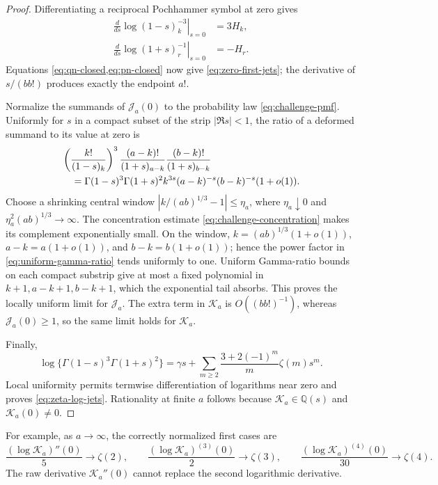 \documentclass[11pt]{article}
\theoremstyle{definition}
\theoremstyle{remark}
\newcommand{\Q}{\mathbb Q}
\begin{document}
\begin{proof}
Differentiating a reciprocal Pochhammer symbol at zero gives
\begin{align*}
 \left.\frac d{ds}\log(1-s)_k^{-3}\right|_{s=0}&=3H_k,\\
 \left.\frac d{ds}\log(1+s)_r^{-1}\right|_{s=0}&=-H_r.
\end{align*}
Equations \cref{eq:qn-closed,eq:pn-closed} now give
\eqref{eq:zero-first-jets}; the derivative of \(s/(bb!)\) produces exactly
the endpoint \(a!\).

Normalize the summands of \(\mathscr J_a(0)\) to the probability law
\eqref{eq:challenge-pmf}.  Uniformly for \(s\) in a compact subset of the
strip \(|\Re s|<1\), the ratio of a deformed summand to its value at zero is
 \begin{align}
 &\left(\frac{k!}{(1-s)_k}\right)^3
 \frac{(a-k)!}{(1+s)_{a-k}}
 \frac{(b-k)!}{(1+s)_{b-k}}\notag\\
 &\quad=\Gamma(1-s)^3\Gamma(1+s)^2
 k^{3s}(a-k)^{-s}(b-k)^{-s}(1+o(1)).
 \label{eq:uniform-gamma-ratio}
 \end{align}
Choose a shrinking central window
\(|k/(ab)^{1/3}-1|\le\eta_a\), where
\(\eta_a\downarrow0\) and \(\eta_a^2(ab)^{1/3}\to\infty\).
The concentration estimate \eqref{eq:challenge-concentration} makes its
complement exponentially small.  On the window,
\(k=(ab)^{1/3}(1+o(1))\), \(a-k=a(1+o(1))\), and
\(b-k=b(1+o(1))\); hence the power factor in
\eqref{eq:uniform-gamma-ratio} tends uniformly to one.  Uniform Gamma-ratio
bounds on each compact substrip give at most a fixed polynomial in
\(k+1,a-k+1,b-k+1\), which the exponential tail absorbs.  This proves the
locally uniform limit for \(\mathscr J_a\).  The extra term in
\(\mathscr K_a\) is \(O((bb!)^{-1})\), whereas
\(\mathscr J_a(0)\ge1\), so the same limit holds for \(\mathscr K_a\).

Finally,
\begin{equation}\label{eq:Gamma-log-series}
 \log\{\Gamma(1-s)^3\Gamma(1+s)^2\}
 =\gamma s+\sum_{m\ge2}\frac{3+2(-1)^m}{m}\zeta(m)s^m.
\end{equation}
Local uniformity permits termwise differentiation of logarithms near zero
and proves \eqref{eq:zeta-log-jets}.  Rationality at finite \(a\) follows
because \(\mathscr K_a\in\Q(s)\) and \(\mathscr K_a(0)\ne0\).
\end{proof}

For example, as \(a\to\infty\), the correctly normalized first cases are
\begin{equation}\label{eq:first-zeta-jets}
 \frac{(\log\mathscr K_a)''(0)}5\to\zeta(2),\qquad
 \frac{(\log\mathscr K_a)^{(3)}(0)}2\to\zeta(3),\qquad
 \frac{(\log\mathscr K_a)^{(4)}(0)}{30}\to\zeta(4).
\end{equation}
The raw derivative \(\mathscr K_a''(0)\) cannot replace the second
logarithmic derivative.
\end{document}
